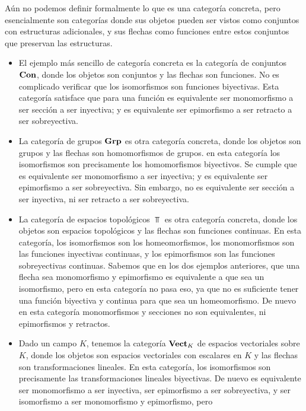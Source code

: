 \documentclass{comunicaciones}
\begin{document}
\begin{ej}
    Aún no podemos definir formalmente lo que es una categoría concreta, pero esencialmente son categorías donde sus objetos pueden ser vistos como conjuntos
    con estructuras adicionales, y sus flechas como funciones entre estos conjuntos que preservan las estructuras.
    \begin{itemize}
        \item El ejemplo más sencillo de categoría concreta es la categoría de conjuntos $\mathbf{Con}$, donde los objetos son conjuntos y las flechas son funciones.
        No es complicado verificar que los isomorfismos son funciones biyectivas. Esta categoría satisface que para una función es equivalente ser monomorfismo a
        ser sección a ser inyectiva; y es equivalente ser epimorfismo a ser retracto a ser sobreyectiva.
        \item La categoría de grupos $\mathbf{Grp}$ es otra categoría concreta, donde los objetos son grupos y las flechas son homomorfismos de grupos. en esta categoría
        los isomorfismos son precisamente los homomorfismos biyectivos. Se cumple que es equivalente ser monomorfismo a ser inyectiva; y es equivalente ser
        epimorfismo a ser sobreyectiva. Sin embargo, no es equivalente ser sección a ser inyectiva, ni ser retracto a ser sobreyectiva.
        \item La categoría de espacios topológicos $\Top$ es otra categoría concreta, donde los objetos son espacios topológicos y las flechas son funciones
        continuas. En esta categoría, los isomorfismos son los homeomorfismos, los monomorfismos son las funciones inyectivas continuas, y los epimorfismos
        son las funciones sobreyectivas continuas. Sabemos que en los dos ejemplos anteriores, que una flecha sea monomorfismo y epimorfismo es equivalente
        a que sea un isomorfismo, pero en esta categoría no pasa eso, ya que no es suficiente tener una función biyectiva y continua para que sea un 
        homeomorfismo. De nuevo en esta categoría monomorfismos y secciones no son equivalentes, ni epimorfismos y retractos. 
        \item Dado un campo $K$, tenemos la categoría $\mathbf{Vect}_K$ de espacios vectoriales sobre $K$, donde los objetos son espacios vectoriales con escalares
        en $K$ y las flechas son transformaciones lineales. En esta categoría, los isomorfismos son precisamente las transformaciones lineales biyectivas. 
        De nuevo es equivalente ser monomorfismo a ser inyectiva, ser epimorfismo a ser sobreyectiva, y ser isomorfismo a ser monomorfismo y epimorfismo, pero

\end{itemize}
\end{ej}
\end{document}
